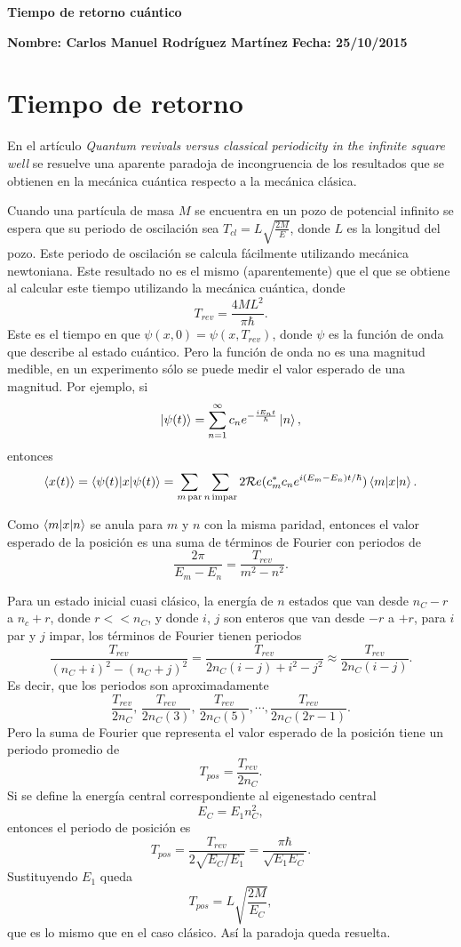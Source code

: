 \documentclass[letterpaper,11pt]{article}
\begin{document}
\begin{center}
{\bf \Large Tiempo de retorno cuántico} 
\end{center}

\noindent
{\bf \large Nombre: Carlos Manuel Rodríguez Martínez} \hspace{5.2cm} {\bf \large Fecha: 25/10/2015} 

\smallskip

\section{Tiempo de retorno}
En el artículo \textit{Quantum revivals versus classical periodicity in the infinite square well} \cite{RT} se resuelve una aparente paradoja de incongruencia de los resultados que se obtienen en la mecánica cuántica respecto a la mecánica clásica.

Cuando una partícula de masa $M$ se encuentra en un pozo de potencial infinito se espera que su periodo de oscilación sea $T_{cl} = L \sqrt{\frac{2 M}{E}}$, donde $L$ es la longitud del pozo. Este periodo de oscilación se calcula fácilmente utilizando mecánica newtoniana. Este resultado no es el mismo (aparentemente) que el que se obtiene al calcular este tiempo utilizando la mecánica cuántica, donde
\[
	T_{rev} = \frac{4 M L^2}{\pi \hbar}.
\]
Este es el tiempo en que $\psi(x, 0) = \psi(x, T_{rev})$, donde $\psi$ es la función de onda que describe al estado cuántico.
Pero la función de onda no es una magnitud medible, en un experimento sólo se puede medir el valor esperado de una magnitud. Por ejemplo, si
\[
	\ket{\psi(t)} = \sum_{n=1}^\infty c_n e^{- \frac{i E_n t}{\hbar}} \ket{n},
\]
entonces
\[
	\braket{x(t)} = \braket{\psi(t) | x | \psi(t)} = \sum_{m \, \text{par}} \sum_{n \, \text{impar}} 2 \mathcal{R}e (c_m^* c_n e^{i(E_m - E_n) t /\hbar}) \braket{m | x | n}.
\]

Como $\braket{m | x | n}$ se anula para $m$ y $n$ con la misma paridad, entonces el valor esperado de la posición es una suma de términos de Fourier con periodos de
\[
	\frac{2 \pi}{E_m - E_n} = \frac{T_{rev}}{m^2 - n^2}.
\]

Para un estado inicial cuasi clásico, la energía de $n$ estados que van desde $n_C - r$ a $n_c + r$, donde $r << n_C$, y donde $i$, $j$ son enteros que van desde $-r$ a $+r$, para $i$ par y $j$ impar, los términos de Fourier tienen periodos
\[
	\frac{T_{rev}}{(n_C + i)^2 - (n_C + j)^2} = \frac{T_{rev}}{2 n_C (i-j) + i^2 - j^2} \approx \frac{T_{rev}}{2 n_C (i-j)}.
\]
Es decir, que los periodos son aproximadamente
\[
	\frac{T_{rev}}{2 n_C},\, \frac{T_{rev}}{2 n_C (3)},\, \frac{T_{rev}}{2 n_C (5)}, \cdots, \frac{T_{rev}}{2 n_C (2 r - 1)}.  
\]
Pero la suma de Fourier que representa el valor esperado de la posición tiene un periodo promedio de
\[
	T_{pos} = \frac{T_{rev}}{2 n_C}.
\]
Si se define la energía central correspondiente al eigenestado central
\[
	E_C = E_1 n_C^2,
\]
entonces el periodo de posición es
\[
	T_{pos} = \frac{T_{rev}}{2 \sqrt{E_C/E_1}} = \frac{\pi \hbar}{\sqrt{E_1 E_C}} .
\]
Sustituyendo $E_1$ queda
\[
	T_{pos} = L \sqrt{\frac{2 M}{E_C}},
\]
que es lo mismo que en el caso clásico. Así la paradoja queda resuelta.
\end{document}
